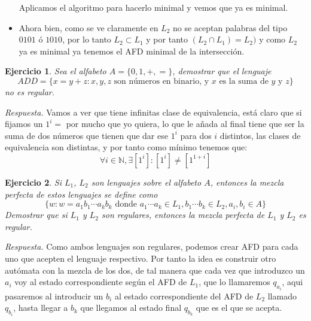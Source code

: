 \documentclass[11pt]{article}
\theoremstyle{ejercicio-style}
\newtheorem{ejer}{Ejercicio}
\begin{document}
\begin{itemize}
\begin{center}
\end{center}
	Aplicamos el algoritmo para hacerlo minimal y vemos que ya es minimal.
	\item Ahora bien, como se ve claramente en $L_2$ no se aceptan palabras del tipo $0101$ ó $1010$, por lo tanto $L_2 \subset L_1$ y por tanto $(L_2 \cap L_1) = L_2)$ y como $L_2$ ya es minimal ya tenemos el AFD minimal de la intersección.
\end{itemize}

\begin{ejer}
Sea el alfabeto $A = \{0,1,+,=\}$, demostrar que el lenguaje
$$ ADD = \{ x = y + z : x,y,z \text{ son números en binario, y } x \text{ es la suma de } y \text{ y } z\}$$
no es regular.
\end{ejer}

\emph{Respuesta.} 
Vamos a ver que tiene infinitas clase de equivalencia, está claro que si fijamos un $1^i=$ por mucho que yo quiera, lo que le añada al final tiene que ser la suma de dos números que tienen que dar ese $1^i$ para dos $i$ distintos, las clases de equivalencia son distintas, y por tanto como mínimo tenemos que: $$\forall i \in \mathbb{N}, \exists [1^i] : [1^i] \neq [1^{1+i}]$$

\begin{ejer}
Si $L_1$, $L_2$ son lenguajes sobre el alfabeto $A$, entonces la mezcla perfecta de estos lenguajes se define como
$$ \{ w : w = a_1b_1 \cdots a_kb_k \text{ donde } a_1\cdots a_k \in L_1 , b_1\cdots b_k \in L_2, a_i,b_i \in A \} $$
Demostrar que si $L_1$ y $L_2$ son regulares, entonces la mezcla perfecta de $L_1$ y $L_2$ es regular.
\end{ejer}

\emph{Respuesta.}
Como ambos lenguajes son regulares, podemos crear AFD para cada uno que acepten el lenguaje respectivo. Por tanto la idea es construir otro autómata con la mezcla de los dos, de tal manera que cada vez que introduzco un $a_i$ voy al estado correspondiente según el AFD de $L_1$, que lo llamaremos $q_{a_i}$, aqui pasaremos al introducir un $b_i$ al estado correspondiente del AFD de $L_2$ llamado $q_{b_i}$, hasta llegar a $b_k$ que llegamos al estado final $q_{b_k}$ que es el que se acepta. \\
\end{document}
